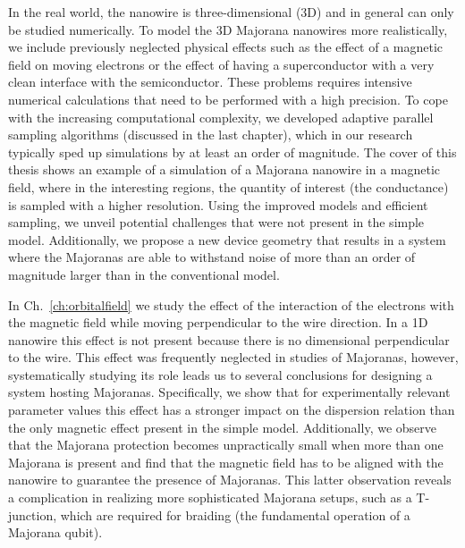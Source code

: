 In the real world, the nanowire is three-dimensional (3D) and in general can only be studied numerically.
To model the 3D Majorana nanowires more realistically, we include previously neglected physical effects such as the effect of a magnetic field on moving electrons or the effect of having a superconductor with a very clean interface with the semiconductor.
These problems requires intensive numerical calculations that need to be performed with a high precision.
To cope with the increasing computational complexity, we developed adaptive parallel sampling algorithms (discussed in the last chapter), which in our research typically sped up simulations by at least an order of magnitude.
The cover of this thesis shows an example of a simulation of a Majorana nanowire in a magnetic field, where in the interesting regions, the quantity of interest (the conductance) is sampled with a higher resolution.
Using the improved models and efficient sampling, we unveil potential challenges that were not present in the simple model.
Additionally, we propose a new device geometry that results in a system where the Majoranas are able to withstand noise of more than an order of magnitude larger than in the conventional model.

In Ch.~\ref{ch:orbitalfield} we study the effect of the interaction of the electrons with the magnetic field while moving perpendicular to the wire direction.
In a 1D nanowire this effect is not present because there is no dimensional perpendicular to the wire.
This effect was frequently neglected in studies of Majoranas, however, systematically studying its role leads us to several conclusions for designing a system hosting Majoranas.
Specifically, we show that for experimentally relevant parameter values this effect has a stronger impact on the dispersion relation than the only magnetic effect present in the simple model.
Additionally, we observe that the Majorana protection becomes unpractically small when more than one Majorana is present and find that the magnetic field has to be aligned with the nanowire to guarantee the presence of Majoranas.
This latter observation reveals a complication in realizing more sophisticated Majorana setups, such as a T-junction, which are required for braiding (the fundamental operation of a Majorana qubit).

